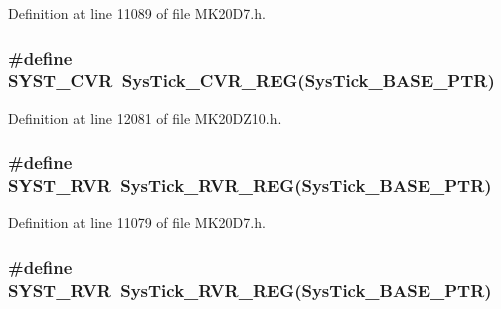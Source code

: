 Definition at line 11089 of file M\+K20\+D7.\+h.

\subsubsection[{\texorpdfstring{S\+Y\+S\+T\+\_\+\+C\+VR}{SYST_CVR}}]{\setlength{\rightskip}{0pt plus 5cm}\#define S\+Y\+S\+T\+\_\+\+C\+VR~{\bf Sys\+Tick\+\_\+\+C\+V\+R\+\_\+\+R\+EG}({\bf Sys\+Tick\+\_\+\+B\+A\+S\+E\+\_\+\+P\+TR})}\hypertarget{group___sys_tick___register___accessor___macros_gae3dc4d2dbfdf38c593a5581415fecfed}{}\label{group___sys_tick___register___accessor___macros_gae3dc4d2dbfdf38c593a5581415fecfed}


Definition at line 12081 of file M\+K20\+D\+Z10.\+h.

\subsubsection[{\texorpdfstring{S\+Y\+S\+T\+\_\+\+R\+VR}{SYST_RVR}}]{\setlength{\rightskip}{0pt plus 5cm}\#define S\+Y\+S\+T\+\_\+\+R\+VR~{\bf Sys\+Tick\+\_\+\+R\+V\+R\+\_\+\+R\+EG}({\bf Sys\+Tick\+\_\+\+B\+A\+S\+E\+\_\+\+P\+TR})}\hypertarget{group___sys_tick___register___accessor___macros_ga4e8efcc1f2b551dbf3cb0aae1231e380}{}\label{group___sys_tick___register___accessor___macros_ga4e8efcc1f2b551dbf3cb0aae1231e380}


Definition at line 11079 of file M\+K20\+D7.\+h.

\subsubsection[{\texorpdfstring{S\+Y\+S\+T\+\_\+\+R\+VR}{SYST_RVR}}]{\setlength{\rightskip}{0pt plus 5cm}\#define S\+Y\+S\+T\+\_\+\+R\+VR~{\bf Sys\+Tick\+\_\+\+R\+V\+R\+\_\+\+R\+EG}({\bf Sys\+Tick\+\_\+\+B\+A\+S\+E\+\_\+\+P\+TR})}\hypertarget{group___sys_tick___register___accessor___macros_ga4e8efcc1f2b551dbf3cb0aae1231e380}{}\label{group___sys_tick___register___accessor___macros_ga4e8efcc1f2b551dbf3cb0aae1231e380}


